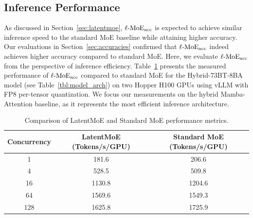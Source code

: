 \begin{table}[h]
    \centering
    \caption{Accuracy comparisons of hybrid Mamba-Attention MoEs with and without LatentMoE. Compared to the baseline, with equivalent parameters, $\lmoeacc$ provides higher accuracy across all downstream tasks, while $\lmoeeff$ provides comparable or better accuracy with much fewer FLOPs.}
    \label{tbl:hybrid_8b_1t}
\end{table}


\subsection{Inference Performance}
As discussed in Section~\ref{sec:latentmoe}, $\lmoeacc$ is expected to achieve similar inference speed to the standard MoE baseline while attaining higher accuracy.
Our evaluations in Section~\ref{sec:accuracies} confirmed that $\lmoeacc$ indeed achieves higher accuracy compared to standard MoE. Here, we evaluate $\lmoeacc$ from the perspective of inference efficiency.
Table~\ref{tbl:measuredperf} presents the measured performance of $\lmoeacc$ compared to standard MoE for the Hybrid-73BT-8BA model (see Table~\ref{tbl:model_arch}) on two Hopper H100 GPUs using vLLM with FP8 per-tensor quantization.
We focus our measurements on the hybrid Mamba-Attention baseline, as it represents the most efficient inference architecture.

\begin{table}[ht!]
    \centering
    \footnotesize
    \begin{tabular}{ccc}
    \hline
     \textbf{Concurrency} & \textbf{LatentMoE (Tokens/s/GPU)} & \textbf{Standard MoE (Tokens/s/GPU)} \\
    \hline
   1 & 181.6 & 206.6 \\
     4 & 528.5 & 509.8 \\
    16 & 1130.8 & 1204.6 \\
     64 & 1569.6 & 1549.3 \\
     128 & 1625.8 & 1725.9 \\
    \hline
    \end{tabular}
    \caption{Comparison of LatentMoE and Standard MoE performance metrics.}
    \label{tbl:measuredperf}
\end{table}


